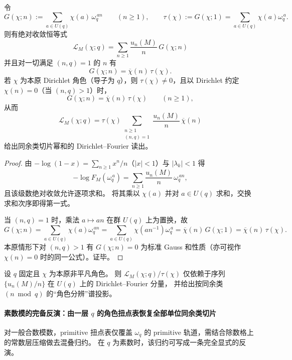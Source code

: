 \begin{theorem}\label{thm:finite-part-dirichlet-torsion-gauss-expansion}
令
\[
G(\chi;n):=\sum_{a\in U(q)}\chi(a)\,\omega_q^{\,an}\qquad(n\ge1),
\qquad
\tau(\chi):=G(\chi;1)=\sum_{a\in U(q)}\chi(a)\omega_q^{\,a}.
\]
则有绝对收敛恒等式
\[
\boxed{\;
\mathcal{L}_M(\chi;q)=\sum_{n\ge1}\frac{u_n(M)}{n}\,G(\chi;n)\;}
\]
并且对一切满足 \((n,q)=1\) 的 \(n\) 有
\[
G(\chi;n)=\overline{\chi}(n)\,\tau(\chi).
\]
若 \(\chi\) 为本原 Dirichlet 角色（导子为 \(q\)），则 \(\tau(\chi)\neq0\)，且以 Dirichlet 约定 \(\chi(n)=0\)（当 \((n,q)>1\)）时，
\[
G(\chi;n)=\overline{\chi}(n)\,\tau(\chi)\qquad(n\ge1),
\]
从而
\[
\boxed{\;
\mathcal{L}_M(\chi;q)
=\tau(\chi)\sum_{\substack{n\ge1\\(n,q)=1}}\frac{u_n(M)}{n}\,\overline{\chi}(n)\;}
\]
给出同余类切片幂和的 Dirichlet--Fourier 读出。
\end{theorem}
\begin{proof}
由 \(-\log(1-x)=\sum_{n\ge1}x^n/n\)（\(|x|<1\)）与 \(|\lambda_k|<1\) 得
\[
-\log F_M(\omega_q^{\,a})
=\sum_{n\ge1}\frac{u_n(M)}{n}\,\omega_q^{\,an},
\]
且该级数绝对收敛允许逐项求和。
将其乘以 \(\chi(a)\) 并对 \(a\in U(q)\) 求和，交换求和次序即得第一式。
\par
当 \((n,q)=1\) 时，乘法 \(a\mapsto an\) 在群 \(U(q)\) 上为置换，故
\[
G(\chi;n)=\sum_{a\in U(q)}\chi(a)\omega_q^{\,an}
=\sum_{a\in U(q)}\chi(an^{-1})\omega_q^{\,a}
=\overline{\chi}(n)\,G(\chi;1)
=\overline{\chi}(n)\,\tau(\chi).
\]
本原情形下对 \((n,q)>1\) 有 \(G(\chi;n)=0\) 为标准 Gauss 和性质（亦可视作 \(\chi(n)=0\) 时的同一公式）。证毕。
\end{proof}

\begin{corollary}\label{cor:finite-part-dirichlet-character-projection}
设 \(q\) 固定且 \(\chi\) 为本原非平凡角色。
则 \(\mathcal{L}_M(\chi;q)/\tau(\chi)\) 仅依赖于序列 \(\{u_n(M)/n\}\) 在 \(U(q)\) 上的 Dirichlet--Fourier 分量，
并给出按同余类 \((n\bmod q)\) 的“角色分辨”谱投影。
\end{corollary}

\paragraph{素数模的完备反演：由一层 \(q\) 的角色扭点表恢复全部单位同余类切片}
对一般合数模数，primitive 扭点表仅覆盖 \(\omega_q\) 的 primitive 轨道，需结合除数格上的常数层压缩做去混叠归约。
在 \(q\) 为素数时，该归约可写成一条完全显式的反演。


